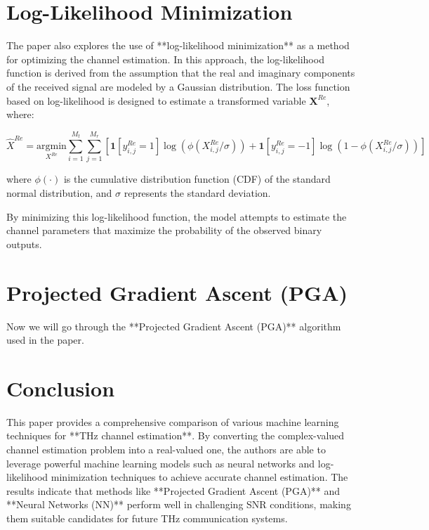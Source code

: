 \documentclass{article}
\begin{document}
\section{Log-Likelihood Minimization}

The paper also explores the use of **log-likelihood minimization** as a method for optimizing the channel estimation. In this approach, the log-likelihood function is derived from the assumption that the real and imaginary components of the received signal are modeled by a Gaussian distribution. The loss function based on log-likelihood is designed to estimate a transformed variable \( \mathbf{X}^{Re} \), where:

\[
\hat{X}^{Re} = \underset{X^{Re}}{\text{argmin}} \sum_{i=1}^{M_t} \sum_{j=1}^{M_r} \left[ \mathbf{1}[y_{i,j}^{Re} = 1] \log(\phi(X_{i,j}^{Re}/\sigma)) + \mathbf{1}[y_{i,j}^{Re} = -1] \log(1 - \phi(X_{i,j}^{Re}/\sigma)) \right]
\]

where \( \phi(\cdot) \) is the cumulative distribution function (CDF) of the standard normal distribution, and \( \sigma \) represents the standard deviation.

By minimizing this log-likelihood function, the model attempts to estimate the channel parameters that maximize the probability of the observed binary outputs.

\section{Projected Gradient Ascent (PGA)}
Now we will go through the **Projected Gradient Ascent (PGA)** algorithm used in the paper. 

\section{Conclusion}

This paper provides a comprehensive comparison of various machine learning techniques for **THz channel estimation**. By converting the complex-valued channel estimation problem into a real-valued one, the authors are able to leverage powerful machine learning models such as neural networks and log-likelihood minimization techniques to achieve accurate channel estimation. The results indicate that methods like **Projected Gradient Ascent (PGA)** and **Neural Networks (NN)** perform well in challenging SNR conditions, making them suitable candidates for future THz communication systems.
\end{document}

